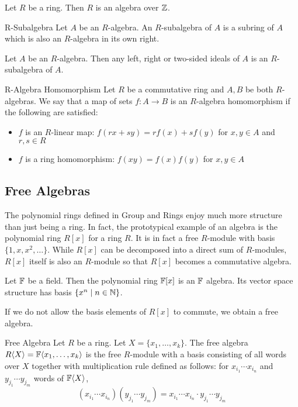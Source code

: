 \documentclass[a4paper]{article}
\begin{document}
\begin{lmm}{}{} Let $R$ be a ring. Then $R$ is an algebra over $\mathbb{Z}$. 
\end{lmm}

\begin{defn}{R-Subalgebra}{} Let $A$ be an $R$-algebra. An $R$-subalgebra of $A$ is a subring of $A$ which is also an $R$-algebra in its own right. 
\end{defn}

\begin{prp}{}{} Let $A$ be an $R$-algebra. Then any left, right or two-sided ideals of $A$ is an $R$-subalgebra of $A$. 
\end{prp}

\begin{defn}{R-Algebra Homomorphism}{} Let $R$ be a commutative ring and $A,B$ be both $R$-algebras. We say that a map of sets $f:A\to B$ is an $R$-algebra homomorphism if the following are satisfied: 
\begin{itemize}
\item $f$ is an $R$-linear map: $f(rx+sy)=rf(x)+sf(y)$ for $x,y\in A$ and $r,s\in R$
\item $f$ is a ring homomorphism: $f(xy)=f(x)f(y)$ for $x,y\in A$
\end{itemize}
\end{defn}

\subsection{Free Algebras}
The polynomial rings defined in Group and Rings enjoy much more structure than just being a ring. In fact, the prototypical example of an algebra is the polynomial ring $R[x]$ for a ring $R$. It is in fact a free $R$-module with basis $\{1,x,x^2,\dots\}$. While $R[x]$ can be decomposed into a direct sum of $R$-modules, $R[x]$ itself is also an $R$-module so that $R[x]$ becomes a commutative algebra. 

\begin{prp}{}{} Let $\mathbb{F}$ be a field. Then the polynomial ring $\mathbb{F}[x]$ is an $\mathbb{F}$ algebra. Its vector space structure has basis $\{x^n\;|\;n\in\mathbb{N}\}$. 
\end{prp}

If we do not allow the basis elements of $R[x]$ to commute, we obtain a free algebra. 

\begin{defn}{Free Algebra}{} Let $R$ be a ring. Let $X=\{x_1,\dots,x_k\}$. The free algebra $R\langle X\rangle=\mathbb{F}\langle x_1,\dots,x_k\rangle$ is the free $R$-module with a basis consisting of all words over $X$ together with multiplication rule defined as follows: for $x_{i_1}\cdots x_{i_n}$ and $y_{j_1}\cdots y_{j_m}$ words of $\mathbb{F}\langle X\rangle$, $$(x_{i_1}\cdots x_{i_n})(y_{j_1}\cdots y_{j_m})=x_{i_1}\cdots x_{i_n}\cdot y_{j_1}\cdots y_{j_m}$$
\end{defn}
\end{document}
